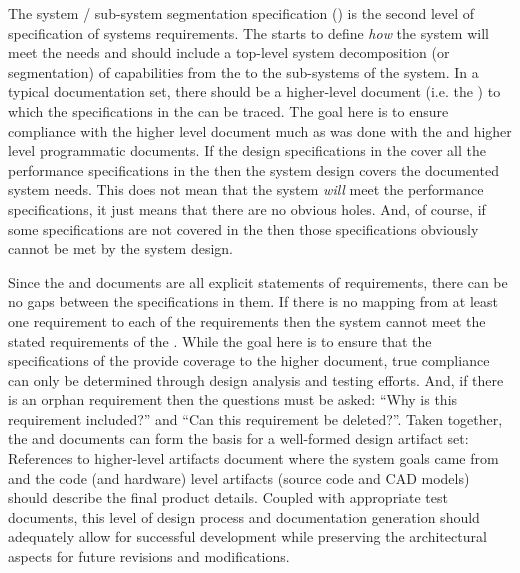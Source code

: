 The system / sub-system segmentation specification (\SSS) is the second level of specification of systems requirements.
The \SSS starts to define {\em how} the system will meet the needs and should include a top-level system decomposition (or segmentation) of capabilities from the \SPS to the sub-systems of the system.
In a typical documentation set, there should be a higher-level document (i.e. the \SPS) to which the specifications in the \SSS can be traced.
The goal here is to ensure compliance with the higher level document much as was done with the \SPS and higher level programmatic documents.
If the design specifications in the \SSS cover all the performance specifications in the \SPS then the system design covers the documented system needs.
This does not mean that the system {\em will} meet the performance specifications, it just means that there are no obvious holes.
And, of course, if some \SPS specifications are not covered in the \SSS then those specifications obviously cannot be met by the system design.


Since the \SPS and \SSS documents are all explicit statements of requirements, there can be no gaps between the specifications in them.
If there is no mapping from at least one \SSS requirement to each of the \SPS requirements then the system cannot meet the stated requirements of the \SPS.
While the goal here is to ensure that the specifications of the \SSS provide coverage to the higher document, true compliance can only be determined through design analysis and testing efforts.
And, if there is an orphan \SSS requirement then the questions must be asked: ``Why is this requirement included?'' and ``Can this requirement be deleted?''.
Taken together, the \SPS and \SSS documents can form the basis for a well-formed design artifact set: 
References to higher-level artifacts document where the system goals came from and the code (and hardware) level artifacts (source code and CAD models) should describe the final product details. 
Coupled with appropriate test documents, this level of design process and documentation generation should adequately allow for successful development while preserving the architectural aspects for future revisions and modifications.

